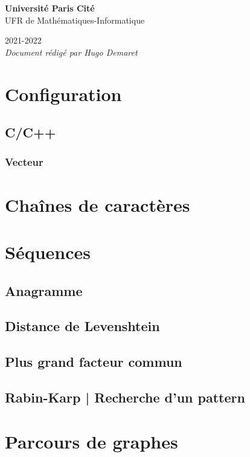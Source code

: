 \documentclass[8pt]{article}
\begin{document}
\begin{titlepage}
\begin{center}
        \textbf{Université Paris Cité}\\
        UFR de Mathématiques-Informatique

        2021-2022\\
        \textit{Document rédigé par Hugo Demaret}
    \end{center}
\end{titlepage}
    \section{Configuration}
        \subsection{C/C++}
            \subsubsection{Vecteur}
            {\scriptsize}
    \section{Chaînes de caractères}
    \section{Séquences}
        \subsection{Anagramme}
        {\scriptsize}
        \subsection{Distance de Levenshtein}
        {\scriptsize}
        \subsection{Plus grand facteur commun}
        {\scriptsize}
        \subsection{Rabin-Karp | Recherche d'un pattern}
        {\scriptsize}
    \section{Parcours de graphes}
\end{document}
